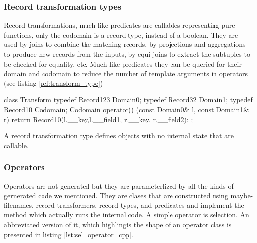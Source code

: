 \subsubsection{Record transformation types}

Record transformations, much like predicates are callables
representing pure functions, only the codomain is a record type,
instead of a boolean. They are used by joins to combine the matching
records, by projections and aggregations to produce new records from
the inputs, by equi-joins to extract the subtuples to be checked for
equality, etc. Much like predicates they can be queried for their
domain and codomain to reduce the number of template arguments in
operators (see listing \ref{ref:transform_type})

\begin{code}
\begin{cppcode}
class Transform {
  typedef Record123 Domain0;
  typedef Record32 Domain1;
  typedef Record10 Codomain;
  Codomain operator() (const Domain0& l, const Domain1& r) {
    return Record10(l.__key,l.__field1, r.__key, r.__field2);
  }
};
\end{cppcode}
  \caption{\label{ref:transform_type}A record transformation type
    defines objects with no internal state that are callable.}
\end{code}


\subsubsection{Operators}

Operators are not generated but they are parameterlized by all the
kinds of gernerated code we mentioned. They are clases that are
constructed using maybe-filenames, record transformers, record types,
and predicates and implement the  method which actually runs
the internal code. A simple operator is selection. An abbreviated
version of it, which highlingts the shape of an operator class is
presented in listing \ref{lst:sel_operator_cpp}.

